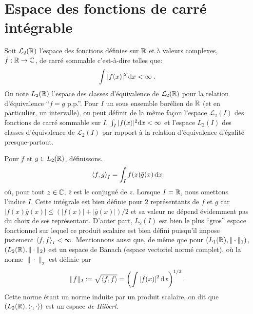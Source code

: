 \section{Espace des fonctions de carr{\'e} int{\'e}grable}
Soit $\mathcal{L}_2(\mathbb{R})$ l'espace des fonctions d{\'e}finies sur $\mathbb{R}$ et
{\`a} valeurs complexes, $f:\mathbb{R}\rightarrow \mathbb{C}$, de carr{\'e} sommable
c'est-{\`a}-dire telles que:
$$
\int |f(x)|^2\,\mathrm{d} x<\infty \;.
$$
On note $L_2(\mathbb{R})$ l'espace des classes d'{\'e}quivalence de
$\mathcal{L}_2(\mathbb{R})$ pour la relation d'{\'e}quivalence ``$f=g$ p.p.''.
Pour $I$ un sous ensemble bor{\'e}lien de $\mathbb{R}$ (et en particulier, un intervalle), on peut d{\'e}finir
de la m{\^e}me fa\c{c}on l'espace $\mathcal{L}_2(I)$ des fonctions  de carr{\'e} sommable sur $I$, $\int_I |f(x)|^2 \mathrm{d} x < \infty$
et l'espace $L_2(I)$ des classes d'{\'e}quivalence de $\mathcal{L}_2(I)$ par rapport {\`a} la relation d'{\'e}quivalence d'{\'e}galit{\'e} presque-partout.


Pour $f$ et $g \in L_2(\mathbb{R})$, d{\'e}finissons.
\begin{equation}
\label{eq:definitionpscal}
\left\langle f, g \right\rangle_I =\int_I f(x) \bar{g}(x)\,\mathrm{d} x
\end{equation}
o{\`u}, pour tout $z \in \mathbb{C}$, $\bar{z}$ est le conjugu{\'e} de $z$. Lorsque $I= \mathbb{R}$, nous omettons  l'indice $I$.
Cette int{\'e}grale est bien d{\'e}finie pour 2 repr{\'e}sentants de $f$ et $g$ car $|f(x) \bar{g}(x)|\leq (|f(x)|+ |\bar{g}(x)|)/2$ et
sa valeur ne d{\'e}pend {\'e}videmment pas du choix de ses repr{\'e}sentant. D'auter part, $L_2(I)$ est bien le plus ``gros'' espace
fonctionnel sur lequel ce produit scalaire est bien d{\'e}fini puisqu'il impose justement $\left\langle f, f \right\rangle_I<\infty$.
Mentionnons aussi que, de m\^eme que pour $(L_1(\mathbb{R}),\|\cdot\|_1)$,  $(L_2(\mathbb{R}),\|\cdot\|_2)$ est un espace de Banach
(espace vectoriel norm{\'e} complet), o{\`u} la norme $\|\cdot\|_2$ est d{\'e}finie par
$$
\|f\|_2:=\sqrt{\left\langle f, f \right\rangle}=\left(\int |f(x)|^2\,\mathrm{d} x\right)^{1/2}.
$$
Cette norme {\'e}tant un norme induite par un produit scalaire, on dit que
$(L_2(\mathbb{R}),\left\langle \cdot, \cdot \right\rangle)$ est un espace
\textit{de Hilbert}.

